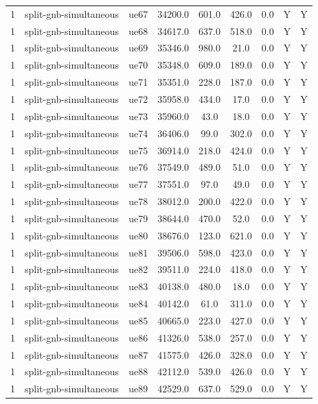 \begin{table}[ht]
\begin{tabular}{|c|c|c|c|c|c|c|c|c|}
1 & split-gnb-simultaneous & ue67 & 34200.0 & 601.0 & 426.0 & 0.0 & Y & Y \\
1 & split-gnb-simultaneous & ue68 & 34617.0 & 637.0 & 518.0 & 0.0 & Y & Y \\
1 & split-gnb-simultaneous & ue69 & 35346.0 & 980.0 & 21.0 & 0.0 & Y & Y \\
1 & split-gnb-simultaneous & ue70 & 35348.0 & 609.0 & 189.0 & 0.0 & Y & Y \\
1 & split-gnb-simultaneous & ue71 & 35351.0 & 228.0 & 187.0 & 0.0 & Y & Y \\
1 & split-gnb-simultaneous & ue72 & 35958.0 & 434.0 & 17.0 & 0.0 & Y & Y \\
1 & split-gnb-simultaneous & ue73 & 35960.0 & 43.0 & 18.0 & 0.0 & Y & Y \\
1 & split-gnb-simultaneous & ue74 & 36406.0 & 99.0 & 302.0 & 0.0 & Y & Y \\
1 & split-gnb-simultaneous & ue75 & 36914.0 & 218.0 & 424.0 & 0.0 & Y & Y \\
1 & split-gnb-simultaneous & ue76 & 37549.0 & 489.0 & 51.0 & 0.0 & Y & Y \\
1 & split-gnb-simultaneous & ue77 & 37551.0 & 97.0 & 49.0 & 0.0 & Y & Y \\
1 & split-gnb-simultaneous & ue78 & 38012.0 & 200.0 & 422.0 & 0.0 & Y & Y \\
1 & split-gnb-simultaneous & ue79 & 38644.0 & 470.0 & 52.0 & 0.0 & Y & Y \\
1 & split-gnb-simultaneous & ue80 & 38676.0 & 123.0 & 621.0 & 0.0 & Y & Y \\
1 & split-gnb-simultaneous & ue81 & 39506.0 & 598.0 & 423.0 & 0.0 & Y & Y \\
1 & split-gnb-simultaneous & ue82 & 39511.0 & 224.0 & 418.0 & 0.0 & Y & Y \\
1 & split-gnb-simultaneous & ue83 & 40138.0 & 480.0 & 18.0 & 0.0 & Y & Y \\
1 & split-gnb-simultaneous & ue84 & 40142.0 & 61.0 & 311.0 & 0.0 & Y & Y \\
1 & split-gnb-simultaneous & ue85 & 40665.0 & 223.0 & 427.0 & 0.0 & Y & Y \\
1 & split-gnb-simultaneous & ue86 & 41326.0 & 538.0 & 257.0 & 0.0 & Y & Y \\
1 & split-gnb-simultaneous & ue87 & 41575.0 & 426.0 & 328.0 & 0.0 & Y & Y \\
1 & split-gnb-simultaneous & ue88 & 42112.0 & 539.0 & 426.0 & 0.0 & Y & Y \\
1 & split-gnb-simultaneous & ue89 & 42529.0 & 637.0 & 529.0 & 0.0 & Y & Y \\

\end{tabular}
\end{table}
